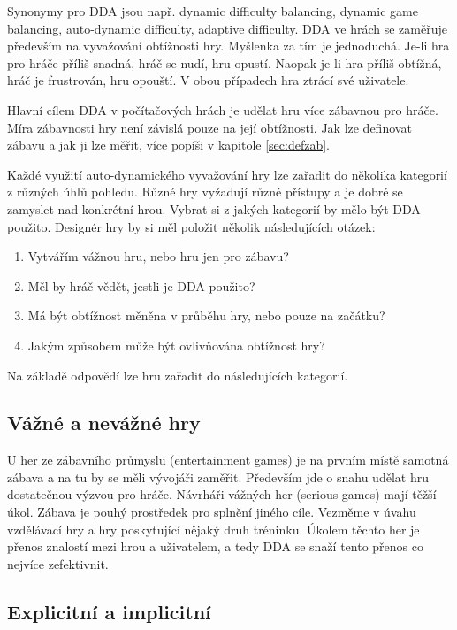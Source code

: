 Synonymy pro DDA jsou např. dynamic difficulty balancing, dynamic game balancing, auto-dynamic difficulty, adaptive difficulty. DDA ve hrách se zaměřuje především na vyvažování obtížnosti hry. Myšlenka za tím je jednoduchá. Je-li hra pro hráče příliš snadná, hráč se nudí, hru opustí. Naopak je-li hra příliš obtížná, hráč je frustrován, hru opouští. V obou případech hra ztrácí své uživatele.

Hlavní cílem DDA v počítačových hrách je udělat hru více zábavnou pro hráče. Míra zábavnosti hry není závislá pouze na její obtížnosti. Jak lze definovat zábavu a jak ji lze měřit, více popíši v kapitole \ref{sec:defzab}. 

Každé využití auto-dynamického vyvažování hry lze zařadit do několika kategorií z různých úhlů pohledu. Různé hry vyžadují různé přístupy a je dobré se zamyslet nad konkrétní hrou. Vybrat si z jakých kategorií by mělo být DDA použito. Designér hry by si měl položit několik následujících otázek:

\begin{enumerate}
  \item Vytvářím vážnou hru, nebo hru jen pro zábavu?
	\item Měl by hráč vědět, jestli je DDA použito?
	\item Má být obtížnost měněna v průběhu hry, nebo pouze na začátku?
	\item Jakým způsobem může být ovlivňována obtížnost hry?
\end{enumerate}

Na základě odpovědí lze hru zařadit do následujících kategorií.

\subsection{Vážné a nevážné hry}

U her ze zábavního průmyslu (entertainment games) je na prvním místě samotná zábava a na tu by se měli vývojáři zaměřit. Především jde o snahu udělat hru dostatečnou výzvou pro hráče. Návrháři vážných her (serious games) mají těžší úkol. Zábava je pouhý prostředek pro splnění jiného cíle. Vezměme v úvahu vzdělávací hry a hry poskytující nějaký druh tréninku. Úkolem těchto her je přenos znalostí mezi hrou a uživatelem, a tedy DDA se snaží tento přenos co nejvíce zefektivnit\cite{16Survey}. 

\subsection{Explicitní a implicitní}

